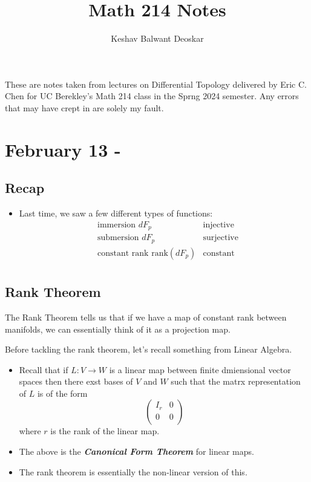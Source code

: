 \documentclass{article}
\title{Math 214 Notes}
\author{Keshav Balwant Deoskar}
\begin{document}
\maketitle

These are notes taken from lectures on Differential Topology delivered by Eric C. Chen for UC Berekley's Math 214 class in the Sprng 2024 semester. Any errors that may have crept in are solely my fault.

\tableofcontents

\pagebreak

\section{February 13 - }

\vskip 0.5cm
\subsection*{Recap}
\begin{itemize}
  \item Last time, we saw a few different types of functions:
  \begin{align*}
    &\text{immersion   } dF_p &\text{injective} \\
    &\text{submersion   } dF_p &\text{surjective} \\
    &\text{constant rank   } \text{rank}(dF_p) &\text{constant} \\
  \end{align*}
\end{itemize}

\subsection{Rank Theorem}

The Rank Theorem tells us that if we have a map of constant rank between manifolds, we can essentially think of it as a projection map. 


\vsize 0.25cm Before tackling the rank theorem, let's recall something from Linear Algebra.

\begin{itemize}
  \item Recall that if $L : V \rightarrow W$ is a linear map between finite dmiensional vector spaces then there exst bases of $V$ and $W$ such that the matrx representation of $L$ is of the form 
  \[ \begin{pmatrix}
    I_r & 0 \\
    0 & 0 \\
  \end{pmatrix} \]
  where $r$ is the rank of the linear map.

  \item The above is the \emph{\textbf{Canonical Form Theorem}} for linear maps. 
  \item The rank theorem is essentially the non-linear version of this.
\end{itemize}
\end{document}
